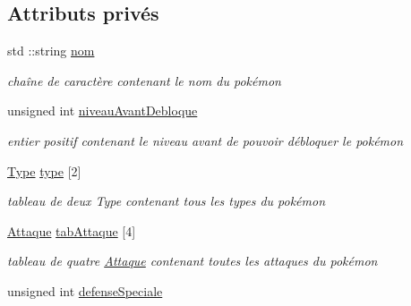 \subsection*{Attributs privés}
\begin{DoxyCompactItemize}
\item 
\mbox{\label{class_pokemon_afcc837b67ac3d801100f25faefe68814}} 
std \+::string \hyperlink{class_pokemon_afcc837b67ac3d801100f25faefe68814}{nom}
\begin{DoxyCompactList}\small\item\em chaîne de caractère contenant le nom du pokémon \end{DoxyCompactList}\item 
\mbox{\label{class_pokemon_a644ed65bf19036ea1dff2a363f445492}} 
unsigned int \hyperlink{class_pokemon_a644ed65bf19036ea1dff2a363f445492}{niveau\+Avant\+Debloque}
\begin{DoxyCompactList}\small\item\em entier positif contenant le niveau avant de pouvoir débloquer le pokémon \end{DoxyCompactList}\item 
\mbox{\label{class_pokemon_a397369731c4147a99338e0b372a13add}} 
\hyperlink{_attaque_8h_a1d1cfd8ffb84e947f82999c682b666a7}{Type} \hyperlink{class_pokemon_a397369731c4147a99338e0b372a13add}{type} \mbox{[}2\mbox{]}
\begin{DoxyCompactList}\small\item\em tableau de deux Type contenant tous les types du pokémon \end{DoxyCompactList}\item 
\mbox{\label{class_pokemon_a678ccdbecac87b185e5b271f0b307642}} 
\hyperlink{class_attaque}{Attaque} \hyperlink{class_pokemon_a678ccdbecac87b185e5b271f0b307642}{tab\+Attaque} \mbox{[}4\mbox{]}
\begin{DoxyCompactList}\small\item\em tableau de quatre \hyperlink{class_attaque}{Attaque} contenant toutes les attaques du pokémon \end{DoxyCompactList}\item 
\mbox{\label{class_pokemon_ae0577fc5911b5b030c746c009116a715}} 
unsigned int \hyperlink{class_pokemon_ae0577fc5911b5b030c746c009116a715}{defense\+Speciale}

\end{DoxyCompactItemize}
